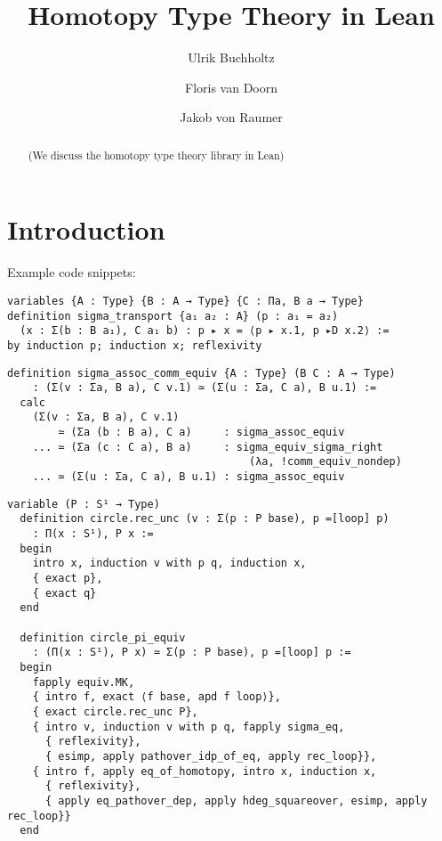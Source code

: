 \documentclass{llncs}
\begin{document}
\title{Homotopy Type Theory in Lean}

\author{Ulrik Buchholtz
  \and Floris van Doorn
  \and Jakob von Raumer}


\maketitle

\begin{abstract}
  (We discuss the homotopy type theory library in Lean)
\end{abstract}

\section{Introduction}
\label{sec:introduction}

Example code snippets:
\begin{lstlisting}
variables {A : Type} {B : A → Type} {C : Πa, B a → Type}
definition sigma_transport {a₁ a₂ : A} (p : a₁ = a₂)
  (x : Σ(b : B a₁), C a₁ b) : p ▸ x = ⟨p ▸ x.1, p ▸D x.2⟩ :=
by induction p; induction x; reflexivity
\end{lstlisting}

\begin{lstlisting}[gobble=2]
  definition sigma_assoc_comm_equiv {A : Type} (B C : A → Type)
    : (Σ(v : Σa, B a), C v.1) ≃ (Σ(u : Σa, C a), B u.1) :=
  calc
    (Σ(v : Σa, B a), C v.1)
        ≃ (Σa (b : B a), C a)     : sigma_assoc_equiv
    ... ≃ (Σa (c : C a), B a)     : sigma_equiv_sigma_right
                                      (λa, !comm_equiv_nondep)
    ... ≃ (Σ(u : Σa, C a), B u.1) : sigma_assoc_equiv
\end{lstlisting}

\begin{lstlisting}[gobble=2]
  variable (P : S¹ → Type)
  definition circle.rec_unc (v : Σ(p : P base), p =[loop] p)
    : Π(x : S¹), P x :=
  begin
    intro x, induction v with p q, induction x,
    { exact p},
    { exact q}
  end

  definition circle_pi_equiv
    : (Π(x : S¹), P x) ≃ Σ(p : P base), p =[loop] p :=
  begin
    fapply equiv.MK,
    { intro f, exact ⟨f base, apd f loop⟩},
    { exact circle.rec_unc P},
    { intro v, induction v with p q, fapply sigma_eq,
      { reflexivity},
      { esimp, apply pathover_idp_of_eq, apply rec_loop}},
    { intro f, apply eq_of_homotopy, intro x, induction x,
      { reflexivity},
      { apply eq_pathover_dep, apply hdeg_squareover, esimp, apply rec_loop}}
  end
\end{lstlisting}
\end{document}
